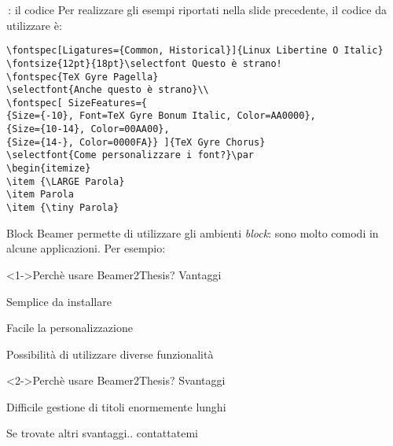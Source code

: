 \begin{frame}[t,fragile]{\XeLaTeX\,: il codice}
Per realizzare gli esempi riportati nella slide precedente, il codice da utilizzare è:
\scriptsize{
\begin{verbatim}
\fontspec[Ligatures={Common, Historical}]{Linux Libertine O Italic}
\fontsize{12pt}{18pt}\selectfont Questo è strano! 
\fontspec{TeX Gyre Pagella}
\selectfont{Anche questo è strano}\\
\fontspec[ SizeFeatures={
{Size={-10}, Font=TeX Gyre Bonum Italic, Color=AA0000},
{Size={10-14}, Color=00AA00},
{Size={14-}, Color=0000FA}} ]{TeX Gyre Chorus}
\selectfont{Come personalizzare i font?}\par
\begin{itemize}
\item {\LARGE Parola}
\item Parola
\item {\tiny Parola}
\end{verbatim}
}
\end{frame}

\begin{tframe}{Block}
Beamer permette di utilizzare gli ambienti \emph{block}: sono molto comodi in alcune applicazioni. Per esempio:
\begin{block}<1->{Perchè usare Beamer2Thesis? Vantaggi}
\begin{adv}
\item Semplice da installare
\item Facile la personalizzazione
\item Possibilità di utilizzare diverse funzionalità
\end{adv}
\end{block}
\begin{block}<2->{Perchè usare Beamer2Thesis? Svantaggi}
\begin{disadv}
\item Difficile gestione di titoli enormemente lunghi
\item Se trovate altri svantaggi.. contattatemi
\end{disadv}
\end{block}
\end{tframe}

